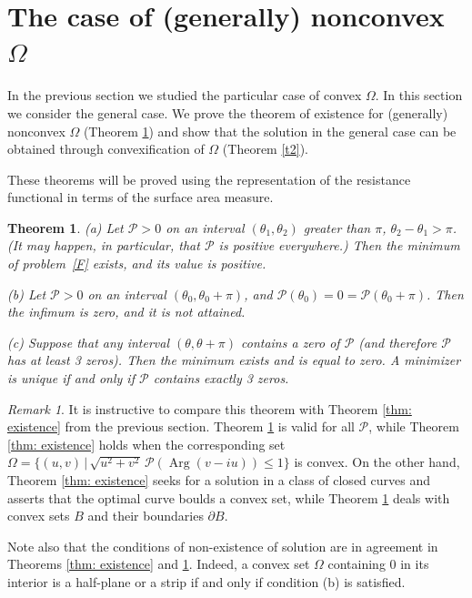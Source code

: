 \documentclass[a4paper,12pt]{article}
\newcommand {\PPP}{\mathcal{P}}
\newtheorem{theorem}{Theorem}
\theoremstyle{remark}
\newtheorem{remark}{Remark}
\theoremstyle{definition}
\begin{document}
\section{The case of (generally) nonconvex \texorpdfstring{$\Omega$}{Ω}}
\label{sec: non convex}


In the previous section we studied the particular case of convex $\Omega$. In this section we consider the general case. We prove the theorem of existence for (generally) nonconvex $\Omega$ (Theorem \ref{t1}) and show that the solution in the general case can be obtained through convexification of $\Omega$ (Theorem \ref{t2}).

These theorems  will be proved using the representation of the resistance functional in terms of the surface area measure.

\begin{theorem}\label{t1}
(a) Let $\PPP > 0$ on an interval $(\theta_1,\theta_2)$ greater than $\pi$, $\theta_2-\theta_1>\pi$. (It may happen, in particular, that $\PPP$ is positive everywhere.) Then the minimum of problem~\eqref{F} exists, and its value is positive.

(b) Let $\PPP > 0$ on an interval $(\theta_0,\theta_0+\pi)$, and $\PPP(\theta_0) = 0 = \PPP(\theta_0+\pi)$. Then the infimum is zero, and it is not attained.

(c) Suppose that any interval $(\theta,\theta+\pi)$ contains a zero of $\PPP$ (and therefore $\PPP$ has at least 3 zeros).
Then the minimum exists and is equal to zero. A minimizer is unique if and only if $\PPP$ contains exactly 3 zeros.
\end{theorem}

\begin{remark}
It is instructive to compare this theorem with Theorem \ref{thm: existence} from the previous section. Theorem \ref{t1} is valid for all $\PPP$, while Theorem \ref{thm: existence} holds when the corresponding set $\Omega=\{(u,v)\,\Big|\, \sqrt{u^2+v^2}\,\PPP(\operatorname{Arg}(v-iu)) \le 1 \}$ is convex. On the other hand, Theorem \ref{thm: existence} seeks for a solution in a class of closed curves and asserts that the optimal curve boulds a convex set, while Theorem \ref{t1} deals with convex sets $B$ and their boundaries $\partial B.$

Note also that the conditions of non-existence of solution are in agreement in Theorems \ref{thm: existence} and \ref{t1}. Indeed, a convex set $\Omega$ containing 0 in its interior is a half-plane or a strip if and only if condition (b) is satisfied.
\end{remark}
\end{document}
